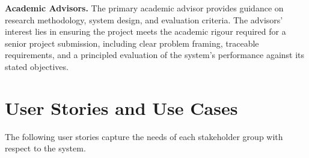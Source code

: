 \textbf{Academic Advisors.} The primary academic advisor provides guidance on
research methodology, system design, and evaluation criteria. The advisors' interest lies in ensuring the project meets
the academic rigour required for a senior project submission, including clear
problem framing, traceable requirements, and a principled evaluation of the
system's performance against its stated objectives.

\newpage
\section{User Stories and Use Cases}
\label{section:user-stories-use-cases}

The following user stories capture the needs of each stakeholder group with
respect to the system.

